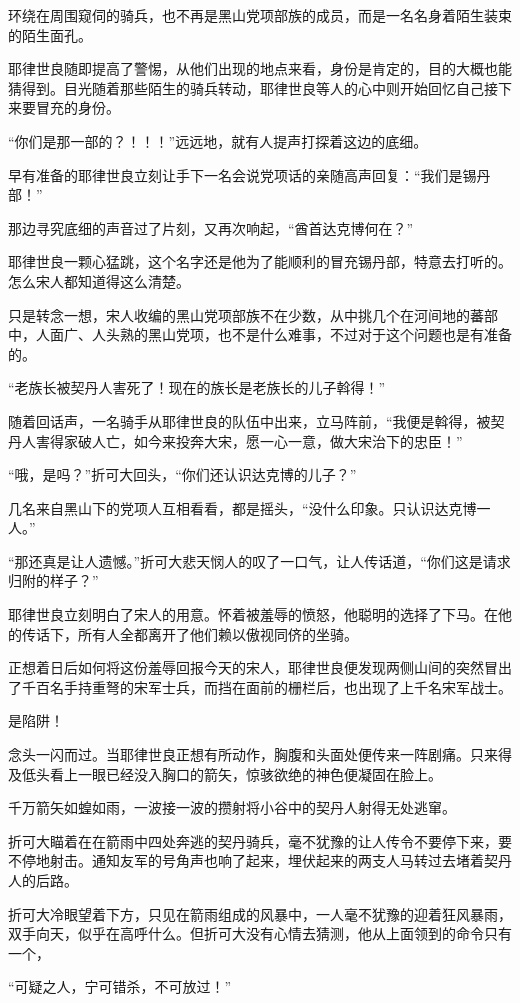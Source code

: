 环绕在周围窥伺的骑兵，也不再是黑山党项部族的成员，而是一名名身着陌生装束的陌生面孔。

耶律世良随即提高了警惕，从他们出现的地点来看，身份是肯定的，目的大概也能猜得到。目光随着那些陌生的骑兵转动，耶律世良等人的心中则开始回忆自己接下来要冒充的身份。

“你们是那一部的？！！！”远远地，就有人提声打探着这边的底细。

早有准备的耶律世良立刻让手下一名会说党项话的亲随高声回复：“我们是锡丹部！”

那边寻究底细的声音过了片刻，又再次响起，“酋首达克博何在？”

耶律世良一颗心猛跳，这个名字还是他为了能顺利的冒充锡丹部，特意去打听的。怎么宋人都知道得这么清楚。

只是转念一想，宋人收编的黑山党项部族不在少数，从中挑几个在河间地的蕃部中，人面广、人头熟的黑山党项，也不是什么难事，不过对于这个问题也是有准备的。

“老族长被契丹人害死了！现在的族长是老族长的儿子斡得！”

随着回话声，一名骑手从耶律世良的队伍中出来，立马阵前，“我便是斡得，被契丹人害得家破人亡，如今来投奔大宋，愿一心一意，做大宋治下的忠臣！”

“哦，是吗？”折可大回头，“你们还认识达克博的儿子？”

几名来自黑山下的党项人互相看看，都是摇头，“没什么印象。只认识达克博一人。”

“那还真是让人遗憾。”折可大悲天悯人的叹了一口气，让人传话道，“你们这是请求归附的样子？”

耶律世良立刻明白了宋人的用意。怀着被羞辱的愤怒，他聪明的选择了下马。在他的传话下，所有人全都离开了他们赖以傲视同侪的坐骑。

正想着日后如何将这份羞辱回报今天的宋人，耶律世良便发现两侧山间的突然冒出了千百名手持重弩的宋军士兵，而挡在面前的栅栏后，也出现了上千名宋军战士。

是陷阱！

念头一闪而过。当耶律世良正想有所动作，胸腹和头面处便传来一阵剧痛。只来得及低头看上一眼已经没入胸口的箭矢，惊骇欲绝的神色便凝固在脸上。

千万箭矢如蝗如雨，一波接一波的攒射将小谷中的契丹人射得无处逃窜。

折可大瞄着在在箭雨中四处奔逃的契丹骑兵，毫不犹豫的让人传令不要停下来，要不停地射击。通知友军的号角声也响了起来，埋伏起来的两支人马转过去堵着契丹人的后路。

折可大冷眼望着下方，只见在箭雨组成的风暴中，一人毫不犹豫的迎着狂风暴雨，双手向天，似乎在高呼什么。但折可大没有心情去猜测，他从上面领到的命令只有一个，

“可疑之人，宁可错杀，不可放过！”

